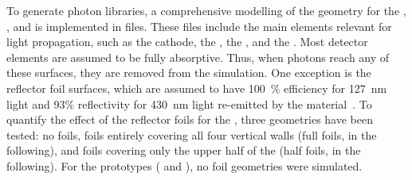 To generate photon libraries, a comprehensive modelling of the geometry for the , , and  is implemented in  files. These files include the main elements relevant for light propagation, such as the cathode, the , the , and the . Most detector elements are assumed to be fully absorptive. 
Thus, when photons reach any of these surfaces, they are removed from the simulation. One exception is the  reflector foil surfaces, which are assumed to have \SI{100}{\%}  efficiency  for \SI{127}{\nm}  light and 93\% reflectivity for \SI{430}{\nm} light re-emitted by the  material~\cite{Francini:2013lua}. 
To quantify the effect of the  reflector foils for the , three geometries have been tested: no foils, foils entirely covering all four  vertical walls (full foils, in the following), and foils covering only the upper half of the  (half foils, in the following). For the  prototypes ( and ), no foil geometries were simulated.

